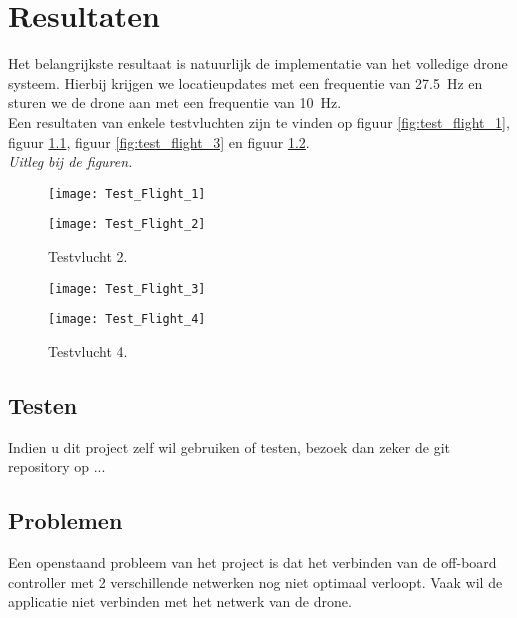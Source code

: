 \chapter{Resultaten}
Het belangrijkste resultaat is natuurlijk de implementatie van het volledige drone systeem. Hierbij krijgen we locatieupdates met een frequentie van \SI{27.5}{\Hz} en sturen we de drone aan met een frequentie van \SI{10}{\Hz}.\\

Een resultaten van enkele testvluchten zijn te vinden op figuur \ref{fig:test_flight_1}, figuur \ref{fig:test_flight_2}, figuur \ref{fig:test_flight_3} en figuur \ref{fig:test_flight_4}.\\
\textit{Uitleg bij de figuren.}
\begin{figure}[p]
	\centering
	\texttt{[image: Test\_Flight\_1]}
	\caption[Testvlucht 1]{Testvlucht 1.}
	\label{fig:test_flight_1}
	
	\centering
	\texttt{[image: Test\_Flight\_2]}
	\caption[Testvlucht 2]{Testvlucht 2.}
	\label{fig:test_flight_2}
\end{figure}
\begin{figure}[p]
	\centering
	\texttt{[image: Test\_Flight\_3]}
	\caption[Testvlucht 3]{Testvlucht 3.}
	\label{fig:test_flight_3}

	\texttt{[image: Test\_Flight\_4]}
	\caption[Testvlucht 4]{Testvlucht 4.}
	\label{fig:test_flight_4}
\end{figure}

\section{Testen} \label{sec:test}
Indien u dit project zelf wil gebruiken of testen, bezoek dan zeker de git repository op ...

\section{Problemen} \label{sec:problems}
Een openstaand probleem van het project is dat het verbinden van de off-board controller met 2 verschillende netwerken nog niet optimaal verloopt. Vaak wil de applicatie niet verbinden met het netwerk van de drone.\\

